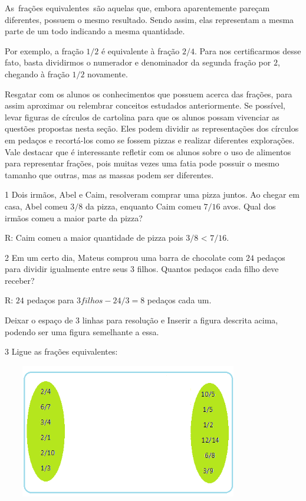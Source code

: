 As~frações equivalentes~são aquelas que, embora aparentemente pareçam
diferentes, possuem o mesmo resultado. Sendo assim, elas representam a
mesma parte de um todo indicando a mesma quantidade.

Por exemplo, a fração $1/2$ é equivalente à fração $2/4$. Para nos
certificarmos desse fato, basta dividirmos o numerador e denominador da
segunda fração por $2$, chegando à fração $1/2$ novamente.

Resgatar com os alunos os conhecimentos que possuem acerca das frações,
para assim aproximar ou relembrar conceitos estudados anteriormente. Se
possível, levar figuras de círculos de cartolina para que os alunos
possam vivenciar as questões propostas nesta seção. Eles podem dividir
as representações dos círculos em pedaços e recortá-los como se fossem
pizzas e realizar diferentes explorações. Vale destacar que é
interessante refletir com os alunos sobre o uso de alimentos para
representar frações, pois muitas vezes uma fatia pode possuir o mesmo
tamanho que outras, mas as massas podem ser diferentes.


\num{1}  Dois irmãos, Abel e Caim, resolveram comprar uma pizza juntos. Ao
chegar em casa, Abel comeu $3/8$ da pizza, enquanto Caim comeu $7/16$ avos.
Qual dos irmãos comeu a maior parte da pizza?

R: Caim comeu a maior quantidade de pizza pois $3/8$ \textless{} $7/16$.

\num{2}  Em um certo dia, Mateus comprou uma barra de chocolate com $24$ pedaços
para dividir igualmente entre seus $3$ filhos. Quantos pedaços cada filho
deve receber?

R: $24$ pedaços para $3 filhos - 24 / 3 = 8$ pedaços cada um.

Deixar o espaço de $3$ linhas para resolução e Inserir a figura descrita
acima, podendo ser uma figura semelhante a essa.

\num{3}  Ligue as frações equivalentes:

\includegraphics[width=4.35393in,height=2.301in]{./imgSAEB_6_MAT/media/image30.png}

